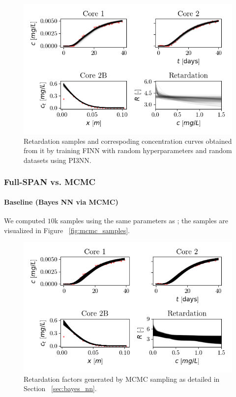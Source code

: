 \begin{figure}[h]
    \centering
    \includegraphics{figs/finn_fullspan_samples.png}
    \caption{Retardation samples and correspoding concentration curves obtained from it by training FINN with random hyperparameters and random datasets using PI3NN.}
    \label{fig:fullspan_samples}
\end{figure}



\subsubsection{Full-SPAN vs. MCMC}

\paragraph{Baseline (Bayes NN via MCMC)}
We computed $10$k samples using the same parameters as \cite{finn}; the samples are visualized in Figure ~\vref{fig:mcmc_samples}.

\begin{figure}[h]
    \centering
    \includegraphics{figs/finn_mcmc_samples.png}
    \caption{Retardation factors generated by MCMC sampling as detailed in Section ~\vref{sec:bayes_nn}.}
    \label{fig:mcmc_samples}
\end{figure}


